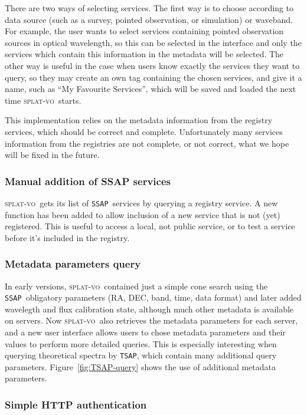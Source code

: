 \documentclass[final,authoryear,5p,times,twocolumn]{elsarticle}
\newcommand{\ssap}{\texttt{SSAP}}
\newcommand{\tsap}{\texttt{TSAP}}
\newcommand{\splatvo}{\textsc{splat-vo}}
\begin{document}
There are two ways of selecting services. The first way is to choose
according to data source (such as a survey, pointed observation, or simulation)
or waveband.  For example, the user wants to select services
containing pointed observation sources in optical wavelength, so this
can be selected in the interface and only the services which contain
this information in the metadata will be selected.  The other way is
useful in the case when users know exactly the services they want to
query, so they may create an own tag containing the chosen services,
and give it a name, such as ``My Favourite Services'', which will be saved
and loaded the next time \splatvo\ starts.

This implementation relies on the metadata information from the
registry services, which should be correct and complete. Unfortunately
many services information from the registries are not complete, or not
correct, what we hope will be fixed in the future.



\subsubsection{Manual addition of SSAP services}

\splatvo\ gets its list of \ssap\ services by querying a registry
service.  A new function has been added to allow inclusion of a new
service that is not (yet) registered. This is useful to access a
local, not public service, or to test a service before it's included
in the registry.

\subsubsection{Metadata parameters query}

In early versions, \splatvo\ contained just a simple cone search using
the \ssap\ obligatory parameters (RA, DEC, band, time, data format) and later
added wavelegth and flux calibration state, although much other metadata is
available on servers.  Now \splatvo\ also retrieves the metadata parameters for
each server, and a new user interface allows users to chose metadata
parameters and their values to perform more detailed queries.  This is
especially interesting when querying theoretical spectra by \tsap, which contain many
additional query parameters. Figure~\ref{fig:TSAP-query} shows the
use of additional metadata parameters.

\subsubsection{Simple HTTP authentication}
\end{document}
